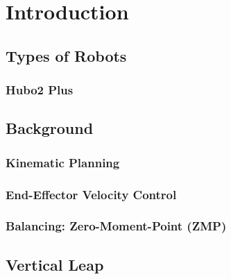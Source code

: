 \section{Introduction}
	
	\subsection{Types of Robots}
		
		\subsubsection{Hubo2 Plus}\label{sec:hubo}
		
	\subsection{Background}
    		
		\subsubsection{Kinematic Planning}
			
		\subsubsection{End-Effector Velocity Control}
			
%			
		\subsubsection{Balancing: Zero-Moment-Point (ZMP)}
			
	\subsection{Vertical Leap}
		

%
%
%
%
%
%

%
%
%

%
%
%
